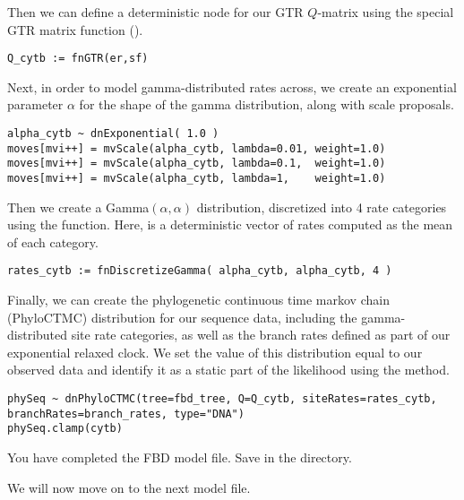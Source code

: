 Then we can define a deterministic node for our GTR $Q$-matrix using the special GTR matrix function ().
{\tt \begin{snugshade*}
\begin{lstlisting}
Q_cytb := fnGTR(er,sf)
\end{lstlisting}
\end{snugshade*}}

Next, in order to model gamma-distributed rates across, we create an exponential parameter $\alpha$ for the shape of the gamma distribution, along with scale proposals.
{\tt \begin{snugshade*}
\begin{lstlisting}
alpha_cytb ~ dnExponential( 1.0 )
moves[mvi++] = mvScale(alpha_cytb, lambda=0.01, weight=1.0)
moves[mvi++] = mvScale(alpha_cytb, lambda=0.1,  weight=1.0)
moves[mvi++] = mvScale(alpha_cytb, lambda=1,    weight=1.0)
\end{lstlisting}
\end{snugshade*}}

Then we create a Gamma$(\alpha,\alpha)$ distribution, discretized into 4 rate categories using the  function.
Here,  is a deterministic vector of rates computed as the mean of each category.
{\tt \begin{snugshade*}
\begin{lstlisting}
rates_cytb := fnDiscretizeGamma( alpha_cytb, alpha_cytb, 4 )
\end{lstlisting}
\end{snugshade*}}

Finally, we can create the phylogenetic continuous time markov chain (PhyloCTMC) distribution for our sequence data, including the gamma-distributed site rate categories, as well as the branch rates defined as part of our exponential relaxed clock.
We set the value of this distribution equal to our observed data and identify it as a static part of the likelihood using the  method.
{\tt \begin{snugshade*}
\begin{lstlisting}
phySeq ~ dnPhyloCTMC(tree=fbd_tree, Q=Q_cytb, siteRates=rates_cytb, branchRates=branch_rates, type="DNA")
phySeq.clamp(cytb)
\end{lstlisting}
\end{snugshade*}}

{\begin{framed}
You have completed the FBD model file. Save  in the  directory.

We will now move on to the next model file.
\end{framed}}

